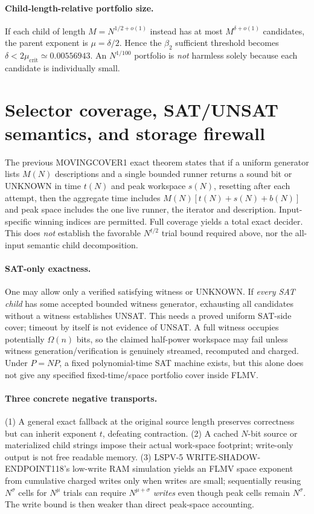 \documentclass[11pt]{article}
\begin{document}
\paragraph{Child-length-relative portfolio size.}
If each child of length $M=N^{1/2+o(1)}$ instead has at most $M^{\delta+o(1)}$ candidates, the parent exponent is $\mu=\delta/2$. Hence the $\beta_2$ sufficient threshold becomes $\delta<2\mu_{\mathrm{crit}}\simeq0.00556943$. An $N^{1/100}$ portfolio is \emph{not} harmless solely because each candidate is individually small.

\section{Selector coverage, SAT/UNSAT semantics, and storage firewall}
The previous MOVINGCOVER1 exact theorem states that if a uniform generator lists $M(N)$ descriptions and a single bounded runner returns a sound bit or UNKNOWN in time $t(N)$ and peak workspace $s(N)$, resetting after each attempt, then the aggregate time includes $M(N)[t(N)+s(N)+b(N)]$ and peak space includes the one live runner, the iterator and description. Input-specific winning indices are permitted. Full coverage yields a total exact decider. This does \emph{not} establish the favorable $N^{t/2}$ trial bound required above, nor the all-input semantic child decomposition.

\paragraph{SAT-only exactness.}
One may allow only a verified satisfying witness or UNKNOWN. If \emph{every SAT child} has some accepted bounded witness generator, exhausting all candidates without a witness establishes UNSAT. This needs a proved uniform SAT-side cover; timeout by itself is not evidence of UNSAT. A full witness occupies potentially $\Omega(n)$ bits, so the claimed half-power workspace may fail unless witness generation/verification is genuinely streamed, recomputed and charged. Under $P=NP$, a fixed polynomial-time SAT machine exists, but this alone does not give any specified fixed-time/space portfolio cover inside FLMV.

\paragraph{Three concrete negative transports.}
(1) A general exact fallback at the original source length preserves correctness but can inherit exponent $t$, defeating contraction. (2) A cached $N$-bit source or materialized child strings impose their actual work-space footprint; write-only output is not free readable memory. (3) LSPV-5 WRITE-SHADOW-ENDPOINT118's low-write RAM simulation yields an FLMV space exponent from cumulative charged writes only when writes are small; sequentially reusing $N^{\sigma}$ cells for $N^\mu$ trials can require $N^{\mu+\sigma}$ \emph{writes} even though peak cells remain $N^\sigma$. The write bound is then weaker than direct peak-space accounting.
\end{document}
